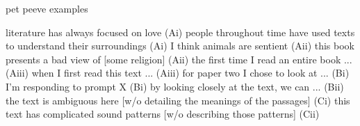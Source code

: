 \documentclass[12pt]{article}
\begin{document}
\begin{exe}
\ex pet peeve examples
    \begin{xlist}
    \ex literature has always focused on love \hfill (Ai)
    \ex people throughout time have used texts to understand their surroundings \hfill (Ai)
    \ex I think animals are sentient \hfill (Aii)
    \ex this book presents a bad view of [some religion] \hfill (Aii)
    \ex the first time I read an entire book ... \hfill (Aiii)
    \ex when I first read this text ... \hfill (Aiii)
    \ex for paper two I chose to look at ... \hfill (Bi)
    \ex I’m responding to prompt X \hfill (Bi)
    \ex by looking closely at the text, we can ... \hfill (Bii)
    \ex the text is ambiguous here [w/o detailing the meanings of the passages] \hfill (Ci)
    \ex this text has complicated sound patterns [w/o describing those patterns] \hfill (Cii)
    \end{xlist}
\end{exe}
\end{document}

